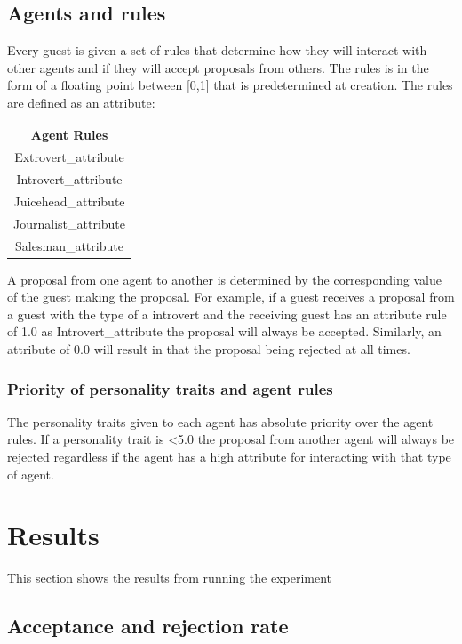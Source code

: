 \documentclass[a4paper,10pt]{article}
\begin{document}
\subsection{Agents and rules}
Every guest is given a set of rules that determine how they will interact with other agents and if they will accept proposals from others. The rules is in the form of a floating point between [0,1] that is predetermined at creation. The rules are defined as an attribute:

\begin{center}
\begin{tabular}{ |c| } 
 \hline
 \textbf{Agent Rules} \\
 Extrovert\_attribute \\
 Introvert\_attribute \\
 Juicehead\_attribute \\
 Journalist\_attribute \\
 Salesman\_attribute \\
 \hline
\end{tabular}
\end{center}

A proposal from one agent to another is determined by the corresponding value of the guest making the proposal. For example, if a guest receives a proposal from a guest with the type of a introvert and the receiving guest has an attribute rule of 1.0 as Introvert\_attribute the proposal will always be accepted. Similarly, an attribute of 0.0 will result in that the proposal being rejected at all times.

\subsubsection{Priority of personality traits and agent rules}
The personality traits given to each agent has absolute priority over the agent rules. If a personality trait is \textless 5.0 the proposal from another agent will always be rejected regardless if the agent has a high attribute for interacting with that type of agent. 

\section{Results}

This section shows the results from running the experiment

\subsection{Acceptance and rejection rate}
\end{document}
